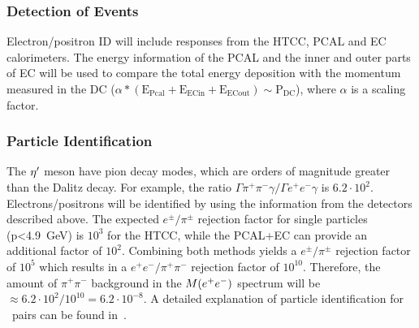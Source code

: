 \subsubsection{Detection of \epemT Events} 
Electron/positron ID will include responses from the HTCC, PCAL and EC calorimeters. The energy information of the PCAL and the inner and outer parts of EC will be used to compare the total energy deposition with the momentum measured in the DC ($\alpha*(\mathrm{E_{Pcal}} + \mathrm{E_{ECin}}+ \mathrm{E_{ECout}}) \sim \mathrm{P_{DC}}$), where $\alpha$ is a scaling factor.
\subsubsection{Particle Identification}
The $\eta^{\prime}$ meson have pion decay modes, which are orders of magnitude greater than the Dalitz decay. For example, the ratio $\Gamma \pi^+\pi^-\gamma / \Gamma e^+e^- \gamma $ is $ 6.2\cdot 10^2$. 
Electrons/positrons will be identified by using the information from the detectors described above. The expected $e^\pm/\pi^\pm$ rejection factor for single particles (p<4.9~GeV) is $10^3$ for the HTCC, while the PCAL+EC can provide an additional factor of $10^2$. Combining both methods yields a $e^\pm/\pi^\pm$ rejection factor of $10^5$ which results in a $e^+e^-/\pi^+\pi^-$ rejection factor of $10^{10}$. Therefore, the amount of $\pi^+\pi^-$ background in the $M(e^+e^-)$ spectrum will be $\approx 6.2\cdot 10^2/10^{10} = 6.2\cdot10^{-8}$. A detailed explanation of particle identification for \epemT \ pairs can be found in~\cite{clas.proposal.jpsi}.
